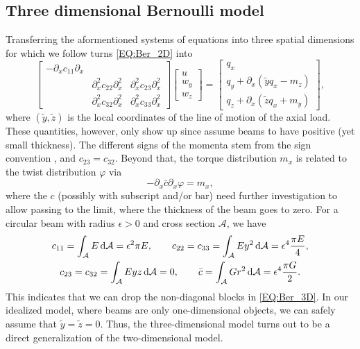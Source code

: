 \documentclass[a4paper, english, 12pt, reqno, draft]{amsart}
\theoremstyle{definition}
\theoremstyle{remark}
\numberwithin{equation}{section}
\newcommand{\longDef}{\ensuremath{u}}
\newcommand{\crossDef}{\ensuremath{w}}
\newcommand{\torsion}{\ensuremath{\varphi}}
\newcommand{\force}{\ensuremath{q}}
\newcommand{\momentum}{\ensuremath{m}}
\newcommand{\crossSect}{\ensuremath{\mathcal A}}
\begin{document}
\subsection{Three dimensional Bernoulli model}
% 
Transferring the aformentioned systems of equations into three spatial dimensions for which we follow \cite[Sect.~6.1--6.4]{BauchauC2009} turns \eqref{EQ:Ber_2D} into
% 
\begin{equation}\label{EQ:Ber_3D}
 \begin{bmatrix}
  -\partial_x c_{11} \partial_x & & \\
  & \partial^2_x c_{22} \partial^2_x & \partial^2_x c_{23} \partial^2_x \\
  & \partial^2_x c_{32} \partial^2_x & \partial^2_x c_{33} \partial^2_x
 \end{bmatrix}
 \begin{bmatrix}
  \longDef \\ \crossDef_y \\ \crossDef_z
 \end{bmatrix}
 =
 \begin{bmatrix}
  \force_x \\ \force_y + \partial_x ( \tilde y \force_x - \momentum_z ) \\ \force_z + \partial_x ( \tilde z \force_x + \momentum_y )
 \end{bmatrix},
\end{equation}
% 
where $(\tilde y, \tilde z)$ is the local coordinates of the line of motion of the axial load. These quantities, however, only show up since \cite[Sect.~5--8]{BauchauC2009} assume beams to have positive (yet small thickness). The different signs of the momenta stem from the sign convention \cite[Sect.~5.2]{BauchauC2009}, and $c_{23} = c_{32}$. Beyond that, the torque distribution $\momentum_x$ is related to the twist distribution $\torsion$ via
% 
\begin{equation}
 -\partial_x \bar c \partial_x \torsion = \momentum_x,
\end{equation}
% 
where the $c$ (possibly with subscript and/or bar) need further investigation to allow passing to the limit, where the thickness of the beam goes to zero. For a circular beam with radius $\epsilon > 0$ and cross section $\crossSect$, we have
% 
\begin{gather*}
 c_{11} = \int_\crossSect E \, \textup d\crossSect = \epsilon^2 \pi E, \qquad c_{22} = c_{33} = \int_\crossSect E y^2 \, \textup d\crossSect = \epsilon^4 \frac{\pi E}{4}, \\
 c_{23} = c_{32} = \int_\crossSect E y z \, \textup d\crossSect = 0, \qquad \bar c = \int_\crossSect G r^2 \, \textup d \crossSect = \epsilon^4 \frac{\pi G}{2}.
\end{gather*}
% 
This indicates that we can drop the non-diagonal blocks in \eqref{EQ:Ber_3D}. In our idealized model, where beams are only one-dimensional objects, we can safely assume that $\tilde y = \tilde z = 0$. Thus, the three-dimensional model turns out to be a direct generalization of the two-dimensional model.


\newpage
% 


% 
\end{document}
